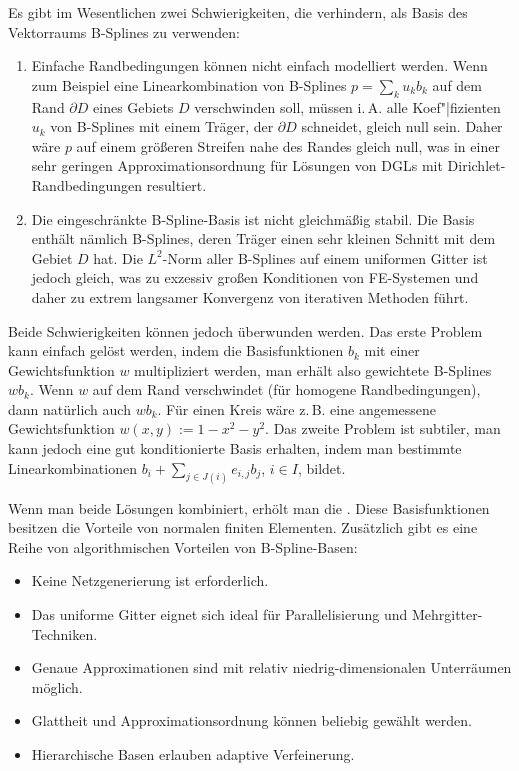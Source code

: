 Es gibt im Wesentlichen zwei Schwierigkeiten, die verhindern, als Basis des Vektorraums B-Splines
zu verwenden:
\begin{enumerate}
    \item
    Einfache Randbedingungen können nicht einfach modelliert werden.
    Wenn zum Beispiel eine Linearkombination von B-Splines $p = \sum_k u_k b_k$ auf dem Rand
    $\partial D$ eines Gebiets $D$ verschwinden soll, müssen i.\,A. alle Koef"|fizienten $u_k$
    von B-Splines mit einem Träger, der $\partial D$ schneidet, gleich null sein.
    Daher wäre $p$ auf einem größeren Streifen nahe des Randes gleich null, was in einer sehr
    geringen Approximationsordnung für Lösungen von DGLs mit Dirichlet-Randbedingungen resultiert.
    
    \item
    Die eingeschränkte B-Spline-Basis ist nicht gleichmäßig stabil.
    Die Basis enthält nämlich B-Splines, deren Träger einen sehr kleinen Schnitt mit
    dem Gebiet $D$ hat.
    Die $L^2$-Norm aller B-Splines auf einem uniformen Gitter ist jedoch gleich, was zu
    exzessiv großen Konditionen von FE-Systemen und daher zu extrem langsamer Konvergenz von
    iterativen Methoden führt.
\end{enumerate}
Beide Schwierigkeiten können jedoch überwunden werden.
Das erste Problem kann einfach gelöst werden, indem die Basisfunktionen $b_k$ mit einer
Gewichtsfunktion $w$ multipliziert werden, man erhält also gewichtete B-Splines $w b_k$.
Wenn $w$ auf dem Rand verschwindet (für homogene Randbedingungen), dann natürlich auch $w b_k$.
Für einen Kreis wäre z.\,B. eine angemessene Gewichtsfunktion $w(x, y) := 1 - x^2 - y^2$.
Das zweite Problem ist subtiler, man kann jedoch eine gut konditionierte Basis erhalten,
indem man bestimmte Linearkombinationen $b_i + \sum_{j \in J(i)} e_{i,j} b_j$, $i \in I$,
bildet.

Wenn man beide Lösungen kombiniert, erhölt man die
.
Diese Basisfunktionen besitzen die Vorteile von normalen finiten Elementen.
Zusätzlich gibt es eine Reihe von algorithmischen Vorteilen von B-Spline-Basen:
\begin{itemize}
    \item
    Keine Netzgenerierung ist erforderlich.
    
    \item
    Das uniforme Gitter eignet sich ideal für Parallelisierung und Mehrgitter-Techniken.
    
    \item
    Genaue Approximationen sind mit relativ niedrig-dimensionalen Unterräumen möglich.
    
    \item
    Glattheit und Approximationsordnung können beliebig gewählt werden.
    
    \item
    Hierarchische Basen erlauben adaptive Verfeinerung.
\end{itemize}

